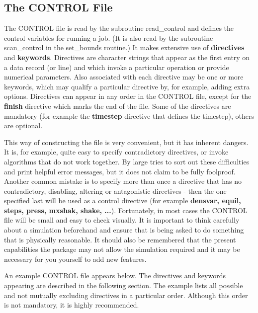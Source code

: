 \subsection{The CONTROL File}
\label{control-file}

The CONTROL file is read by the subroutine {\sc read\_control} and
defines the control variables for running a \D job.  (It is also
read by the subroutine {\sc scan\_control} in the {\sc
set\_bounds} routine.)  It makes extensive use of {\bf directives}
and {\bf keywords}.  Directives are character strings that appear
as the first entry on a data record (or line) and which invoke a
particular operation or provide numerical parameters.  Also
associated with each directive may be one or more keywords, which
may qualify a particular directive by, for example, adding extra
options.  Directives can appear in any order in the CONTROL file,
except for the {\bf finish} directive which marks the end of the
file.  Some of the directives are mandatory (for example the {\bf
timestep} directive that defines the timestep), others are
optional.

This way of constructing the file is very convenient, but it has
inherent dangers.  It is, for example, quite easy to specify
contradictory directives, or invoke algorithms
that do not work together.  By large \D tries to sort out these
difficulties and print helpful error messages, but it does not
claim to be fully foolproof.  Another common mistake is to specify
more than once a directive that has no contradictory, disabling,
altering or antagonistic directives - then the one specified
last will be used as a control directive (for example
{\bf densvar, equil, steps, press, mxshak, shake, ...}).
Fortunately, in most cases the CONTROL file will be small and
easy to check visually.  It is important to think carefully about
a simulation beforehand and ensure that \D is being asked to do
something that is physically reasonable.  It should also be
remembered that the present capabilities the package may not
allow the simulation required and it may be necessary for you
yourself to add new features.

An example CONTROL file appears below.  The directives and
keywords appearing are described in the following section.  The
example lists all possible and not mutually excluding directives
in a particular order.  Although this order is not mandatory, it
is highly recommended.

